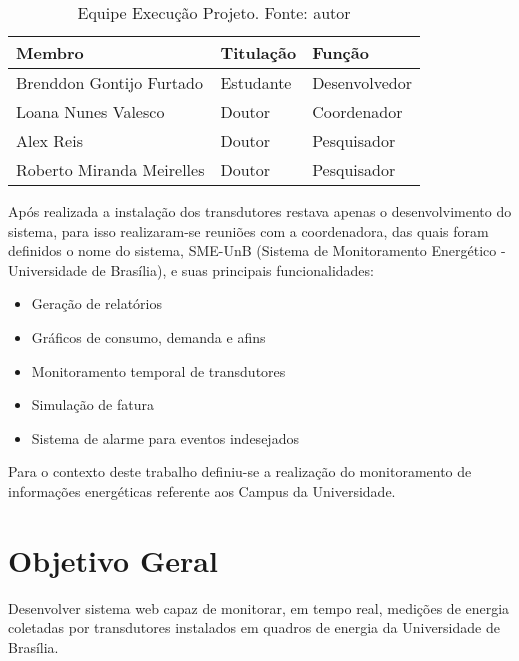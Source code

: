 \begin{table}[!htbp]
    \centering
    \caption{Equipe Execução Projeto. Fonte: autor}
    \label{equipe_projeto}
    \begin{tabular}{|p{5cm}|p{2cm}|p{3cm}|}
    \hline
    \textbf{Membro}                                                                    & \textbf{Titulação} & \textbf{Função}        \\\hline
    Brenddon Gontijo Furtado                                                  & Estudante & Desenvolvedor \\\hline
    Loana Nunes Valesco                                                       & Doutor    & Coordenador   \\\hline
    Alex Reis                                                                 & Doutor    & Pesquisador   \\\hline
    Roberto Miranda Meirelles                                                 & Doutor    & Pesquisador   \\\hline
    \end{tabular}
\end{table}

Após realizada a instalação dos transdutores restava apenas o desenvolvimento do sistema, para isso realizaram-se reuniões com a coordenadora, das quais foram definidos o nome do sistema, SME-UnB (Sistema de Monitoramento Energético - Universidade de Brasília), e suas principais funcionalidades:
\begin{itemize}
    \item Geração de relatórios
    \item Gráficos de consumo, demanda e afins
    \item Monitoramento temporal de transdutores
    \item Simulação de fatura
    \item Sistema de alarme para eventos indesejados
\end{itemize}

Para o contexto deste trabalho definiu-se a realização do monitoramento de informações energéticas referente aos Campus da Universidade.

\section{Objetivo Geral}
Desenvolver sistema web capaz de monitorar, em tempo real, medições de energia coletadas por transdutores
instalados em quadros de energia da Universidade de Brasília.

